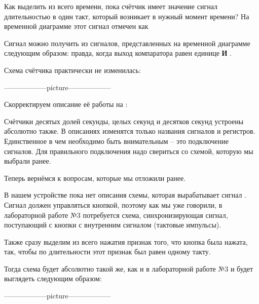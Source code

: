 \par{Как выделить из всего времени, пока счётчик имеет значение  сигнал длительностью в один такт, который возникает в нужный момент времени? На временной диаграмме этот сигнал отмечен как 

\par{Сигнал  можно получить из сигналов, представленных на временной диаграмме следующим образом:  правда, когда выход компаратора равен единице \textbf{И} .}

\par{Схема счётчика практически не изменилась:}

\par{------------------picture------------------}

\par{Скорректируем описание её работы на :}



\par{Счётчики десятых долей секунды, целых секунд и десятков секунд устроены абсолютно также. В описаниях изменятся только названия сигналов и регистров. Единственное в чем необходимо быть внимательным – это подключение сигналов. Для правильного подключения надо свериться со схемой, которую мы выбрали ранее.}

\par{Теперь вернёмся к вопросам, которые мы отложили ранее.}

\par{В нашем устройстве пока нет описания схемы, которая вырабатывает сигнал . Сигнал должен управляться кнопкой, поэтому как мы уже говорили, в лабораторной работе №3 потребуется схема, синхронизирующая сигнал, поступающий с кнопки с внутренним сигналом  (тактовые импульсы).}

\par{Также сразу выделим из всего нажатия признак того, что кнопка была нажата, так, чтобы по длительности этот признак был равен одному такту.}

\par{Тогда схема будет абсолютно такой же, как и в лабораторной работе №3 и будет выглядеть следующим образом:}

\par{------------------picture------------------}

}
